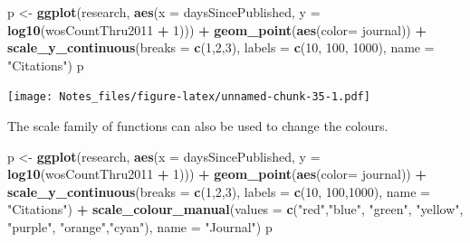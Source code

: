 \documentclass[
]{book}
\newenvironment{Shaded}{\begin{snugshade}}{\end{snugshade}}
\newcommand{\DataTypeTok}[1]{\textcolor[rgb]{0.13,0.29,0.53}{#1}}
\newcommand{\DecValTok}[1]{\textcolor[rgb]{0.00,0.00,0.81}{#1}}
\newcommand{\KeywordTok}[1]{\textcolor[rgb]{0.13,0.29,0.53}{\textbf{#1}}}
\newcommand{\NormalTok}[1]{#1}
\newcommand{\OperatorTok}[1]{\textcolor[rgb]{0.81,0.36,0.00}{\textbf{#1}}}
\newcommand{\StringTok}[1]{\textcolor[rgb]{0.31,0.60,0.02}{#1}}
\begin{document}
\begin{Shaded}
\begin{Highlighting}[]
\NormalTok{p <-}\StringTok{ }\KeywordTok{ggplot}\NormalTok{(research, }\KeywordTok{aes}\NormalTok{(}\DataTypeTok{x =}\NormalTok{ daysSincePublished, }
                          \DataTypeTok{y =} \KeywordTok{log10}\NormalTok{(wosCountThru2011 }\OperatorTok{+}\StringTok{ }\DecValTok{1}\NormalTok{))) }\OperatorTok{+}\StringTok{ }
\StringTok{  }\KeywordTok{geom_point}\NormalTok{(}\KeywordTok{aes}\NormalTok{(}\DataTypeTok{color=}\NormalTok{ journal)) }\OperatorTok{+}
\StringTok{  }\KeywordTok{scale_y_continuous}\NormalTok{(}\DataTypeTok{breaks =} \KeywordTok{c}\NormalTok{(}\DecValTok{1}\NormalTok{,}\DecValTok{2}\NormalTok{,}\DecValTok{3}\NormalTok{), }\DataTypeTok{labels =} \KeywordTok{c}\NormalTok{(}\DecValTok{10}\NormalTok{, }\DecValTok{100}\NormalTok{, }\DecValTok{1000}\NormalTok{), }\DataTypeTok{name =} \StringTok{"Citations"}\NormalTok{)}
\NormalTok{p}
\end{Highlighting}
\end{Shaded}

\texttt{[image: Notes\_files/figure-latex/unnamed-chunk-35-1.pdf]}

The scale family of functions can also be used to change the colours.

\begin{Shaded}
\begin{Highlighting}[]
\NormalTok{p <-}\StringTok{ }\KeywordTok{ggplot}\NormalTok{(research, }\KeywordTok{aes}\NormalTok{(}\DataTypeTok{x =}\NormalTok{ daysSincePublished, }
                          \DataTypeTok{y =} \KeywordTok{log10}\NormalTok{(wosCountThru2011 }\OperatorTok{+}\StringTok{ }\DecValTok{1}\NormalTok{))) }\OperatorTok{+}\StringTok{ }
\StringTok{  }\KeywordTok{geom_point}\NormalTok{(}\KeywordTok{aes}\NormalTok{(}\DataTypeTok{color=}\NormalTok{ journal)) }\OperatorTok{+}
\StringTok{  }\KeywordTok{scale_y_continuous}\NormalTok{(}\DataTypeTok{breaks =} \KeywordTok{c}\NormalTok{(}\DecValTok{1}\NormalTok{,}\DecValTok{2}\NormalTok{,}\DecValTok{3}\NormalTok{), }\DataTypeTok{labels =} \KeywordTok{c}\NormalTok{(}\DecValTok{10}\NormalTok{, }\DecValTok{100}\NormalTok{,}\DecValTok{1000}\NormalTok{), }\DataTypeTok{name =} \StringTok{"Citations"}\NormalTok{) }\OperatorTok{+}
\StringTok{  }\KeywordTok{scale_colour_manual}\NormalTok{(}\DataTypeTok{values =} \KeywordTok{c}\NormalTok{(}\StringTok{"red"}\NormalTok{,}\StringTok{"blue"}\NormalTok{, }\StringTok{"green"}\NormalTok{, }\StringTok{"yellow"}\NormalTok{, }\StringTok{"purple"}\NormalTok{, }\StringTok{"orange"}\NormalTok{,}\StringTok{"cyan"}\NormalTok{), }\DataTypeTok{name =} \StringTok{"Journal"}\NormalTok{)}
\NormalTok{p}
\end{Highlighting}
\end{Shaded}
\end{document}
